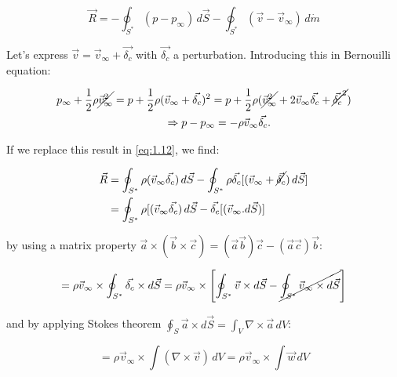 			\begin{equation}
				\vec{R} = -\oint _{S^*} (p-p_\infty) \, d\vec{S} - \oint _{S^*} (\vec{v}-\vec{v}_\infty) \, d\dot{m}
				\label{eq:1.12}
			\end{equation}
			
			Let's express $\vec{v} = \vec{v}_\infty + \vec{\delta _c}$ with $\vec{\delta _c}$ a perturbation. Introducing this in Bernouilli equation: 
			
			\begin{equation}
			\begin{aligned}
			p_\infty +\frac{1}{2} \rho \cancel{\vec{v}_\infty ^2} = p + \frac{1}{2} \rho( &\vec{v}_\infty + \vec{\delta _c})^2 = p + \frac{1}{2} \rho (\cancel{\vec{v}_\infty ^2} + 2 \vec{v}_\infty \vec{\delta _c} + \cancel{\vec{\delta _c}^2}) \\
			&\Rightarrow p-p_\infty = - \rho\vec{v}_\infty \vec{\delta _c}	.		
			\end{aligned}
			\end{equation}
			
			If we replace this result in \eqref{eq:1.12}, we find:
			
			\begin{equation}
			\begin{aligned}
			\vec{R} &= \oint _{S^*} \rho (\vec{v}_\infty \vec{\delta _c} ) \, d\vec{S} - \oint _{S^*} \rho \vec{\delta _c} [(\vec{v}_\infty + \cancel{\vec{\delta _c}} ) \, d\vec{S}] \\
			&=\oint _{S^*} \rho [(\vec{v}_\infty \vec{\delta _c}) \, d\vec{S} - \vec{\delta _c} [(\vec{v}_\infty . d\vec{S})]
			\end{aligned}
			\end{equation}
			
			by using a matrix property $\vec{a} \times (\vec{b} \times \vec{c}) = (\vec{a} \vec{b})\vec{c} - (\vec{a}\vec{c})\vec{b}$:
			
			\begin{equation}
			= \rho \vec{v}_\infty \times \oint _{S^*} \vec{\delta _c} \times d\vec{S} = \rho \vec{v}_\infty \times \left[\oint _{S^*} \vec{v} \times d\vec{S} - \cancel{\oint _{S^*} \vec{v}_\infty \times d\vec{S}}\right]
			\end{equation}
			
			and by applying Stokes theorem $\oint _S \vec{a} \times d\vec{S} = \int _V \nabla \times \vec{a} \, dV$:
			
			\begin{equation}
			= \rho \vec{v}_\infty \times \int  (\nabla \times \vec{v})\, dV = \rho \vec{v}_\infty \times \int  \vec{w}\, dV
			\end{equation}
			
